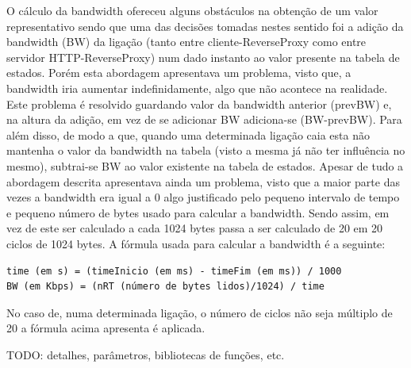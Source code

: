\documentclass{article}
\begin{document}
O cálculo da bandwidth ofereceu alguns obstáculos na obtenção de um valor representativo sendo que uma das decisões tomadas nestes sentido foi a adição da bandwidth (BW) da ligação (tanto entre cliente-ReverseProxy como entre servidor HTTP-ReverseProxy) num dado instanto ao valor presente na tabela de estados. Porém esta abordagem apresentava um problema, visto que, a bandwidth iria aumentar indefinidamente, algo que não acontece na realidade. Este problema é resolvido guardando valor da bandwidth anterior (prevBW) e, na altura da adição, em vez de se adicionar BW adiciona-se (BW-prevBW). Para além disso, de modo a que, quando uma determinada ligação caia esta não mantenha o valor da bandwidth na tabela (visto a mesma já não ter influência no mesmo), subtrai-se BW ao valor existente na tabela de estados. Apesar de tudo a abordagem descrita apresentava ainda um problema, visto que a maior parte das vezes a bandwidth era igual a 0 algo justificado pelo pequeno intervalo de tempo e pequeno número de bytes usado para calcular a bandwidth. Sendo assim, em vez de este ser calculado a cada 1024 bytes passa a ser calculado de 20 em 20 ciclos de 1024 bytes. A fórmula usada para calcular a bandwidth é a seguinte:
\begin{verbatim}
time (em s) = (timeInicio (em ms) - timeFim (em ms)) / 1000
BW (em Kbps) = (nRT (número de bytes lidos)/1024) / time
\end{verbatim}
No caso de, numa determinada ligação, o número de ciclos  não seja múltiplo de 20 a fórmula acima apresenta é aplicada.

{\color{red}TODO: detalhes, parâmetros, bibliotecas de funções, etc.}
\end{document}
